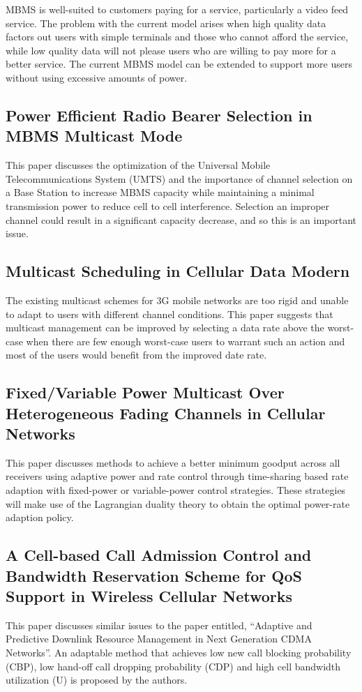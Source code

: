 \documentclass[11pt]{article}
\begin{document}
MBMS is well-suited to customers paying for a service, particularly a
video feed service. The problem with the current model arises when
high quality data factors out users with simple terminals and those
who cannot afford the service, while low quality data will not please
users who are willing to pay more for a better service. The current
MBMS model can be extended to support more users without using
excessive amounts of power.

\subsection{Power Efficient Radio Bearer Selection in MBMS Multicast Mode}

This paper discusses the optimization of the Universal Mobile
Telecommunications System (UMTS) and the importance of channel
selection on a Base Station to increase MBMS capacity while
maintaining a minimal transmission power to reduce cell to cell
interference. Selection an improper channel could result in a
significant capacity decrease, and so this is an important issue.

\subsection{Multicast Scheduling in Cellular Data Modern}

The existing multicast schemes for 3G mobile networks are too rigid
and unable to adapt to users with different channel conditions. This
paper suggests that multicast management can be improved by selecting
a data rate above the worst-case when there are few enough worst-case
users to warrant such an action and most of the users would benefit
from the improved date rate.

\subsection{Fixed/Variable Power Multicast Over Heterogeneous Fading
  Channels in Cellular Networks}

This paper discusses methods to achieve a better minimum goodput
across all receivers using adaptive power and rate control through
time-sharing based rate adaption with fixed-power or variable-power
control strategies. These strategies will make use of the Lagrangian
duality theory to obtain the optimal power-rate adaption policy.

\subsection{A Cell-based Call Admission Control and Bandwidth
  Reservation Scheme for QoS Support in Wireless Cellular Networks}

This paper discusses similar issues to the paper entitled, “Adaptive
and Predictive Downlink Resource Management in Next Generation CDMA
Networks”. An adaptable method that achieves low new call blocking
probability (CBP), low hand-off call dropping probability (CDP) and
high cell bandwidth utilization (U) is proposed by the authors.
\end{document}
